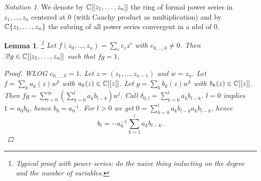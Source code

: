 \documentclass[A4paper, british, reqno]{amsart}
\theoremstyle{darkgreentheorem}
\newtheorem{lm}[thm]{Lemma}
\theoremstyle{darkbluedefinition}
\theoremstyle{darkredexample}
\theoremstyle{remark}
\newtheorem{nota}[thm]{Notation}
\newcommand{\1}{\mathbbm{1}}
\begin{document}
\begin{nota}
    We denote by $\mathbb{C}[[z_{1},\ldots,z_{n}]]$ the ring of formal power series in $z_{1},\ldots,z_{n}$ centered at $0$ (with Cauchy product as multiplication) and by $\mathbb{C}\{z_{1},\ldots,z_{n}\}$ the subring of all power series convergent in a nbd of $0$.
\end{nota}

\begin{lm}\footnote{Typical proof with power series: do the naive thing inducting on the degree and the number of variables.}
    Let $f(z_{0},\ldots,z_{n})=\sum_{r} c_{r}z^{r}$ with $c_{0,\ldots, 0}\neq 0$.
    Then $\exists !g\in \mathbb{C}[[z_{1},\ldots,z_{n}]]$ such that $fg=1$.
    \begin{proof}
	WLOG $c_{0,\ldots, 0}=1$.
	Let $z=(z_{1},\ldots,z_{n-1})$ and $w=z_{n}$.
	Let $f=\sum_{k}a_{k}(z)w^{k}$ with $a_{k}(z)\in \mathbb{C}[[z]]$.
	Let $g=\sum_{k} b_{k}(z)w^{k}$ with $b_{k}(z)\in \mathbb{C}[[z]]$.
	Then $fg=\sum_{l=0}^{\infty}(\sum_{k=0}^{l}a_{k}b_{l-k})w^{l}$.
	Call $\delta_{0,l}=\sum_{k=0}^{l}a_{k}b_{l-k}$.
	$l=0$ implies $1=a_{0}b_{0}$, hence $b_{0}=a_{0}^{-1}$.
	For $l>0$ we get $0=\sum_{k=0}^{l}a_{k}b_{l-k}a_{k}b_{l-k}$, hence
	\[b_{l}=-a_{0}^{-1}\sum_{k=1}^{l}a_{k}b_{l-k}.\]
    \end{proof}
\end{lm}
\end{document}
